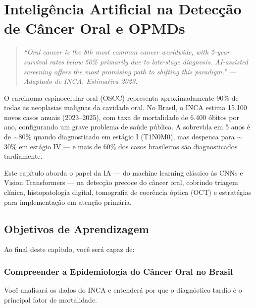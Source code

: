 
\chapter{Inteligência Artificial na Detecção de Câncer Oral e OPMDs}
\label{cap:cancer-oral}

\nivelquatro

\begin{quote}
\itshape\small
``Oral cancer is the 8th most common cancer worldwide, with 5-year survival rates
below 50\% primarily due to late-stage diagnosis. AI-assisted screening offers the
most promising path to shifting this paradigm.'' --- Adaptado de INCA, Estimativa 2023.
\end{quote}

O carcinoma espinocelular oral (OSCC) representa aproximadamente 90\% de todas as
neoplasias malignas da cavidade oral. No Brasil, o INCA estima 15.100 novos casos
anuais (2023--2025), com taxa de mortalidade de 6.400 óbitos por ano, configurando
um grave problema de saúde pública. A sobrevida em 5 anos é de $\sim$80\% quando
diagnosticado em estágio I (T1N0M0), mas despenca para $\sim$30\% em estágio IV
--- e mais de 60\% dos casos brasileiros são diagnosticados tardiamente.

Este capítulo aborda o papel da IA --- do machine learning clássico às CNNs e
Vision Transformers --- na detecção precoce do câncer oral, cobrindo triagem
clínica, histopatologia digital, tomografia de coerência óptica (OCT) e estratégias
para implementação em atenção primária.


\section{Objetivos de Aprendizagem}

Ao final deste capítulo, você será capaz de:

\subsection{Compreender a Epidemiologia do Câncer Oral no Brasil}
Você analisará os dados do INCA e entenderá por que o diagnóstico tardio é o principal fator de mortalidade.

